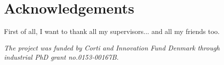 \chapter[acknowledgements]{Acknowledgements}
First of all, I want to thank all my supervisors... and all my friends too.


\vspace*{\fill}
\noindent \textit{The project was funded by Corti and Innovation Fund Denmark through industrial PhD grant no.\@ 0153-00167B.}
